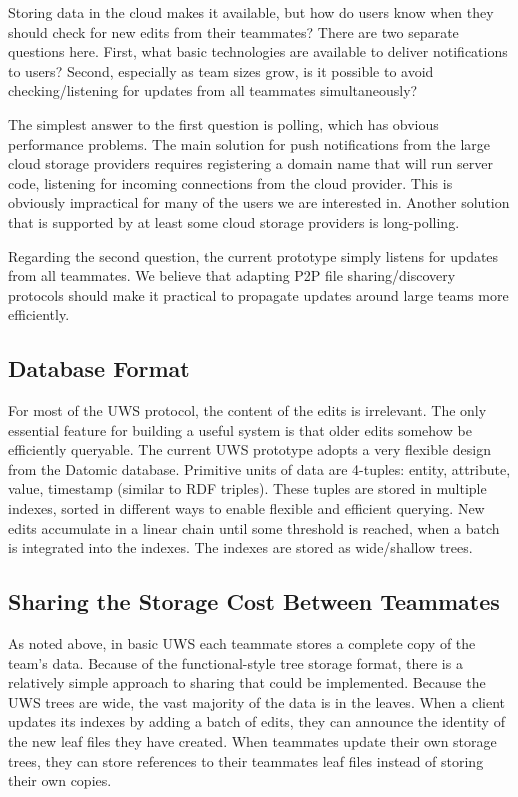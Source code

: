\documentclass[runningheads]{llncs}
\begin{document}
Storing data in the cloud makes it available, but how do users know when they should check for new edits from their teammates?
There are two separate questions here.
First, what basic technologies are available to deliver notifications to users?
Second, especially as team sizes grow, is it possible to avoid checking{\slash}listening for updates from all teammates simultaneously?

The simplest answer to the first question is polling, which has obvious performance problems.
The main solution for push notifications from the large cloud storage providers requires registering a domain name that will run server code, listening for incoming connections from the cloud provider.
This is obviously impractical for many of the users we are interested in.
Another solution that is supported by at least some cloud storage providers is long-polling.

Regarding the second question, the current prototype simply listens for updates from all teammates.
We believe that adapting P2P file sharing{\slash}discovery protocols should make it practical to propagate updates around large teams more efficiently.

\subsection{Database Format}

For most of the UWS protocol, the content of the edits is irrelevant.
The only essential feature for building a useful system is that older edits somehow be efficiently queryable.
The current UWS prototype adopts a very flexible design from the Datomic database.
Primitive units of data are 4-tuples: entity, attribute, value, timestamp (similar to RDF triples).
These tuples are stored in multiple indexes, sorted in different ways to enable flexible and efficient querying.
New edits accumulate in a linear chain until some threshold is reached, when a batch is integrated into the indexes.
The indexes are stored as wide{\slash}shallow trees.

\subsection{Sharing the Storage Cost Between Teammates}

As noted above, in basic UWS each teammate stores a complete copy of the team's data.
Because of the functional-style tree storage format, there is a relatively simple approach to sharing that could be implemented.
Because the UWS trees are wide, the vast majority of the data is in the leaves.
When a client updates its indexes by adding a batch of edits, they can announce the identity of the new leaf files they have created.
When teammates update their own storage trees, they can store references to their teammates leaf files instead of storing their own copies.
\end{document}
